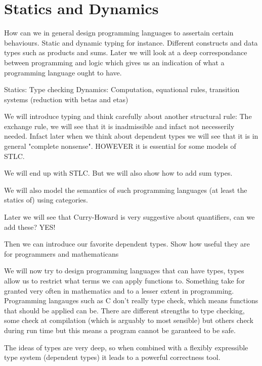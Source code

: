 \section{Statics and Dynamics}

How can we in general design programming languages to assertain certain behaviours. Static and dynamic typing for instance. Different constructs and data types such as products and sums. Later we will look at a deep correspondance between programming and logic which gives us an indication of what a programming language ought to have.

Statics: Type checking
Dynamics: Computation, equational rules, transition systems (reduction with betas and etas)

We will introduce typing and think carefully about another structural rule: The exchange rule, we will see that it is inadmissible and infact not necesserily needed. Infact later when we think about dependent types we will see that it is in general "complete nonsense". HOWEVER it is essential for some models of STLC.

We will end up with STLC. But we will also show how to add sum types.

We will also model the semantics of such programming languages (at least the statics of) using categories.

Later we will see that Curry-Howard is very suggestive about quantifiers, can we add these? YES!

Then we can introduce our favorite dependent types. Show how useful they are for programmers and mathematicans

We will now try to design programming languages that can have types, types allow us to restrict what terms we can apply functions to. Something take for granted very often in mathematics and to a lesser extent in programming. Programming langauges such as C don't really type check, which means functions that should be applied can be. There are different strengths to type checking, some check at compilation (which is arguably to most sensible) but others check during run time but this means a program cannot be garanteed to be safe.

The ideas of types are very deep, so when combined with a flexibly expressible type system (dependent types) it leads to a powerful correctness tool.


